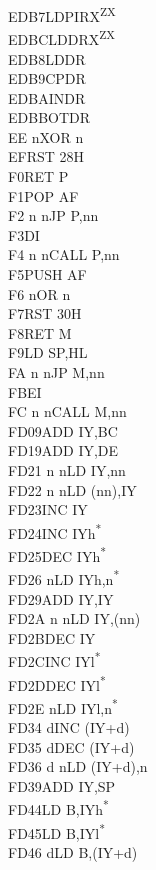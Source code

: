 \documentclass[twoside,openright,a4paper]{book}
\begin{document}
\begin{multicols}{3}
{\begin{tabbing}
	EDB7\>LDPIRX\textsuperscript{ZX}\\
	EDBC\>LDDRX\textsuperscript{ZX}\\
	EDB8\>LDDR\\
	EDB9\>CPDR\\
	EDBA\>INDR\\
	EDBB\>OTDR\\
	EE n\>XOR n\\
	EF\>RST 28H\\
	F0\>RET P\\
	F1\>POP AF\\
	F2 n n\>JP P,nn\\
	F3\>DI\\
	F4 n n\>CALL P,nn\\
	F5\>PUSH AF\\
	F6 n\>OR n\\
	F7\>RST 30H\\
	F8\>RET M\\
	F9\>LD SP,HL\\
	FA n n\>JP M,nn\\
	FB\>EI\\
	FC n n\>CALL M,nn\\
	FD09\>ADD IY,BC\\
	FD19\>ADD IY,DE\\
	FD21 n n\>LD IY,nn\\
	FD22 n n\>LD (nn),IY\\
	FD23\>INC IY\\
	FD24\>INC IYh\textsuperscript{*}\\
	FD25\>DEC IYh\textsuperscript{*}\\
	FD26 n\>LD IYh,n\textsuperscript{*}\\
	FD29\>ADD IY,IY\\
	FD2A n n\>LD IY,(nn)\\
	FD2B\>DEC IY\\
	FD2C\>INC IYl\textsuperscript{*}\\
	FD2D\>DEC IYl\textsuperscript{*}\\
	FD2E n\>LD IYl,n\textsuperscript{*}\\
	FD34 d\>INC (IY+d)\\
	FD35 d\>DEC (IY+d)\\
	FD36 d n\>LD (IY+d),n\\
	FD39\>ADD IY,SP\\
	FD44\>LD B,IYh\textsuperscript{*}\\
	FD45\>LD B,IYl\textsuperscript{*}\\
	FD46 d\>LD B,(IY+d)\\

\end{tabbing}}
\end{multicols}
\end{document}

